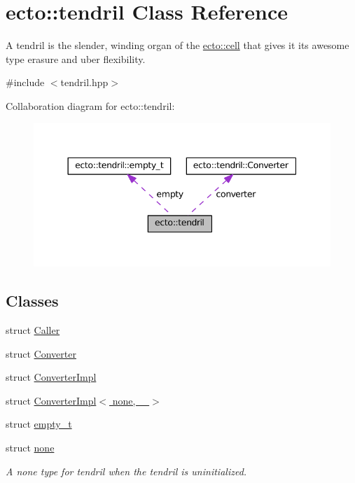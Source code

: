 \hypertarget{classecto_1_1tendril}{}\section{ecto\+:\+:tendril Class Reference}
\label{classecto_1_1tendril}


A tendril is the slender, winding organ of the \hyperlink{structecto_1_1cell}{ecto\+::cell} that gives it its awesome type erasure and uber flexibility.  




{\ttfamily \#include $<$tendril.\+hpp$>$}



Collaboration diagram for ecto\+:\+:tendril\+:\nopagebreak
\begin{figure}[H]
\begin{center}
\leavevmode
\includegraphics[width=344pt]{classecto_1_1tendril__coll__graph}
\end{center}
\end{figure}
\subsection*{Classes}
\begin{DoxyCompactItemize}
\item 
struct \hyperlink{structecto_1_1tendril_1_1Caller}{Caller}
\item 
struct \hyperlink{structecto_1_1tendril_1_1Converter}{Converter}
\item 
struct \hyperlink{structecto_1_1tendril_1_1ConverterImpl}{Converter\+Impl}
\item 
struct \hyperlink{structecto_1_1tendril_1_1ConverterImpl_3_01none_00_01___01_4}{Converter\+Impl$<$ none, \+\_\+ $>$}
\item 
struct \hyperlink{structecto_1_1tendril_1_1empty__t}{empty\+\_\+t}
\item 
struct \hyperlink{structecto_1_1tendril_1_1none}{none}
\begin{DoxyCompactList}\small\item\em A none type for tendril when the tendril is uninitialized. \end{DoxyCompactList}\end{DoxyCompactItemize}
